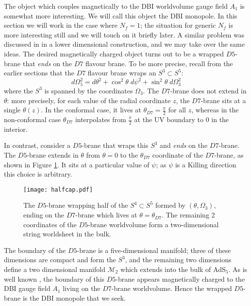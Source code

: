 \documentclass[aps,preprint,nofootinbib,preprintnumbers,eqsecnum,superscriptaddress]{revtex4}
\newcommand\Om{\Omega}
\def\th{{\theta}}
\newcommand\sM{{\ensuremath{{\mathcal M}}}}
\begin{document}
The object which couples magnetically to the DBI worldvolume gauge field $A_1$ is somewhat more interesting. We will call this object the DBI monopole. In this section we will work in the case where $N_f = 1$; the situation for generic $N_f$ is more interesting still and we will touch on it briefly later. A similar problem was discussed in \cite{Iqbal:2014cga} in a lower dimensional construction, and we may take over the same ideas. The desired magnetically charged object turns out to be a wrapped $D5$-brane that {\it ends} on the $D7$ flavour brane. To be more precise, recall from the earlier sections that the $D7$ flavour brane wraps an $S^3 \subset S^5$:
\begin{equation}
d\Omega_5^2 = d\theta^2 + \cos^2{\theta} \; d\psi^2 + \sin^2{\theta} \; d\Omega_3^2 \label{S5repeat} 
\end{equation}
where the $S^3$ is spanned by the coordinates $\Omega_3$. The $D7$-brane does not extend in $\theta$: more precisely, for each value of the radial coordinate $z$, the $D7$-brane sits at a single $\theta(z)$. In the conformal case, it lives at $\theta_{D7} = \frac{\pi}{2}$ for all $z$, whereas in the non-conformal case $\theta_{D7}$ interpolates from $\frac{\pi}{2}$ at the UV boundary to $0$ in the interior. 

In contrast, consider a $D5$-brane that wraps this $S^3$ and {\it ends} on the $D7$-brane. The $D5$-brane extends in $\theta$ from $\theta = 0$ to the $\theta_{D7}$ coordinate of the $D7$-brane, as shown in Figure \ref{fig:halfcap}. It sits at a particular value of $\psi$; as $\psi$ is a Killing direction this choice is arbitrary. 

\begin{figure}[h!]
\begin{center}
\texttt{[image: halfcap.pdf]}
\caption{\label{fig:halfcap}
The $D5$-brane wrapping half of the $S^{4} \subset S^{5}$ formed by $(\th, \Om_{3})$, ending on the $D7$-brane which lives at $\theta = \theta_{D7}$. The remaining 2 coordinates of the $D5$-brane worldvolume form a two-dimensional string worldsheet in the bulk. }
\end{center}
\end{figure}

The boundary of the $D5$-brane is a five-dimensional manifold; three of these dimensions are compact and form the $S^3$, and the remaining two dimensions define a two dimensional manifold $\sM_2$ which extends into the bulk of AdS$_5$. As is well known \cite{Strominger:1995ac}, the boundary of this $D5$-brane appears magnetically charged to the DBI gauge field $A_1$ living on the $D7$-brane worldvolume. Hence the wrapped $D5$-brane is the DBI monopole that we seek. 
\end{document}
